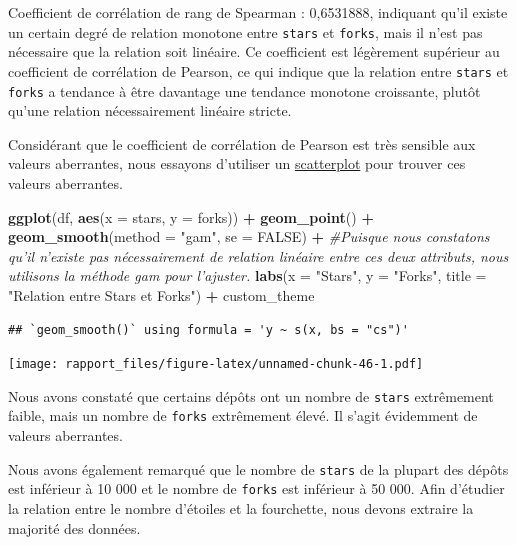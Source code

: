 \documentclass[
]{article}
\newenvironment{Shaded}{\begin{snugshade}}{\end{snugshade}}
\newcommand{\AttributeTok}[1]{\textcolor[rgb]{0.13,0.29,0.53}{#1}}
\newcommand{\CommentTok}[1]{\textcolor[rgb]{0.56,0.35,0.01}{\textit{#1}}}
\newcommand{\ConstantTok}[1]{\textcolor[rgb]{0.56,0.35,0.01}{#1}}
\newcommand{\FunctionTok}[1]{\textcolor[rgb]{0.13,0.29,0.53}{\textbf{#1}}}
\newcommand{\NormalTok}[1]{#1}
\newcommand{\SpecialCharTok}[1]{\textcolor[rgb]{0.81,0.36,0.00}{\textbf{#1}}}
\newcommand{\StringTok}[1]{\textcolor[rgb]{0.31,0.60,0.02}{#1}}
\begin{document}
Coefficient de corrélation de rang de Spearman : 0,6531888, indiquant
qu'il existe un certain degré de relation monotone entre \texttt{stars}
et \texttt{forks}, mais il n'est pas nécessaire que la relation soit
linéaire. Ce coefficient est légèrement supérieur au coefficient de
corrélation de Pearson, ce qui indique que la relation entre
\texttt{stars} et \texttt{forks} a tendance à être davantage une
tendance monotone croissante, plutôt qu'une relation nécessairement
linéaire stricte.

Considérant que le coefficient de corrélation de Pearson est très
sensible aux valeurs aberrantes, nous essayons d'utiliser un
\href{https://datavizcatalogue.com/methods/scatterplot.html}{scatterplot}
pour trouver ces valeurs aberrantes.

\begin{Shaded}
\begin{Highlighting}[]
\FunctionTok{ggplot}\NormalTok{(df, }\FunctionTok{aes}\NormalTok{(}\AttributeTok{x =}\NormalTok{ stars, }\AttributeTok{y =}\NormalTok{ forks)) }\SpecialCharTok{+}
  \FunctionTok{geom\_point}\NormalTok{() }\SpecialCharTok{+}  
  \FunctionTok{geom\_smooth}\NormalTok{(}\AttributeTok{method =} \StringTok{"gam"}\NormalTok{, }\AttributeTok{se =} \ConstantTok{FALSE}\NormalTok{) }\SpecialCharTok{+}  \CommentTok{\#Puisque nous constatons qu’il n’existe pas nécessairement de relation linéaire entre ces deux attributs, nous utilisons la méthode gam pour l’ajuster.}
  \FunctionTok{labs}\NormalTok{(}\AttributeTok{x =} \StringTok{"Stars"}\NormalTok{, }\AttributeTok{y =} \StringTok{"Forks"}\NormalTok{, }\AttributeTok{title =} \StringTok{"Relation entre Stars et Forks"}\NormalTok{) }\SpecialCharTok{+}
\NormalTok{  custom\_theme}
\end{Highlighting}
\end{Shaded}

\begin{verbatim}
## `geom_smooth()` using formula = 'y ~ s(x, bs = "cs")'
\end{verbatim}

\texttt{[image: rapport\_files/figure-latex/unnamed-chunk-46-1.pdf]}

Nous avons constaté que certains dépôts ont un nombre de \texttt{stars}
extrêmement faible, mais un nombre de \texttt{forks} extrêmement élevé.
Il s'agit évidemment de valeurs aberrantes.

Nous avons également remarqué que le nombre de \texttt{stars} de la
plupart des dépôts est inférieur à 10 000 et le nombre de \texttt{forks}
est inférieur à 50 000. Afin d'étudier la relation entre le nombre
d'étoiles et la fourchette, nous devons extraire la majorité des
données.
\end{document}
